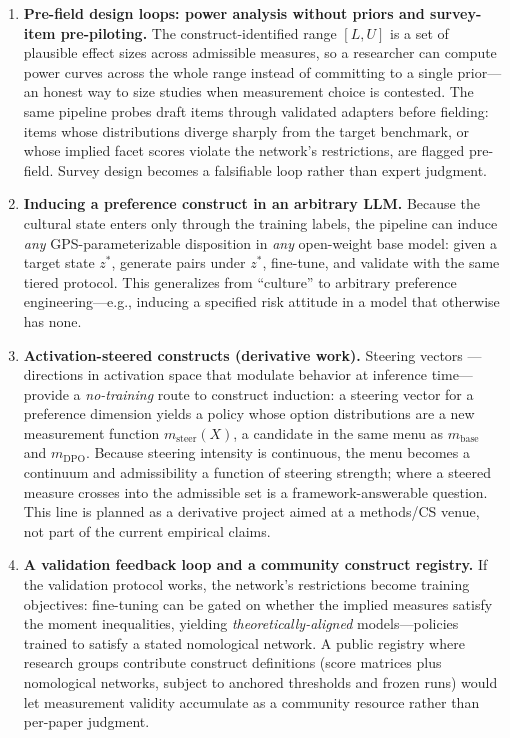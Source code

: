 \documentclass[11pt,letterpaper]{article}
\begin{document}
\begin{enumerate}[leftmargin=1.5em]
  \item \textbf{Pre-field design loops: power analysis without priors and survey-item pre-piloting.} The construct-identified range $[L,U]$ is a set of plausible effect sizes across admissible measures, so a researcher can compute power curves across the whole range instead of committing to a single prior---an honest way to size studies when measurement choice is contested. The same pipeline probes draft items through validated adapters before fielding: items whose distributions diverge sharply from the target benchmark, or whose implied facet scores violate the network's restrictions, are flagged pre-field. Survey design becomes a falsifiable loop rather than expert judgment.
  \item \textbf{Inducing a preference construct in an arbitrary LLM.} Because the cultural state enters only through the training labels, the pipeline can induce \emph{any} GPS-parameterizable disposition in \emph{any} open-weight base model: given a target state $z^*$, generate pairs under $z^*$, fine-tune, and validate with the same tiered protocol. This generalizes from ``culture'' to arbitrary preference engineering---e.g., inducing a specified risk attitude in a model that otherwise has none.
  \item \textbf{Activation-steered constructs (derivative work).} Steering vectors \cite{turner2023,zou2023}---directions in activation space that modulate behavior at inference time---provide a \emph{no-training} route to construct induction: a steering vector for a preference dimension yields a policy whose option distributions are a new measurement function $m_{\mathrm{steer}}(X)$, a candidate in the same menu as $m_{\mathrm{base}}$ and $m_{\mathrm{DPO}}$. Because steering intensity is continuous, the menu becomes a continuum and admissibility a function of steering strength; where a steered measure crosses into the admissible set is a framework-answerable question. This line is planned as a derivative project aimed at a methods/CS venue, not part of the current empirical claims.
  \item \textbf{A validation feedback loop and a community construct registry.} If the validation protocol works, the network's restrictions become training objectives: fine-tuning can be gated on whether the implied measures satisfy the moment inequalities, yielding \emph{theoretically-aligned} models---policies trained to satisfy a stated nomological network. A public registry where research groups contribute construct definitions (score matrices plus nomological networks, subject to anchored thresholds and frozen runs) would let measurement validity accumulate as a community resource rather than per-paper judgment.
\end{enumerate}
\end{document}
